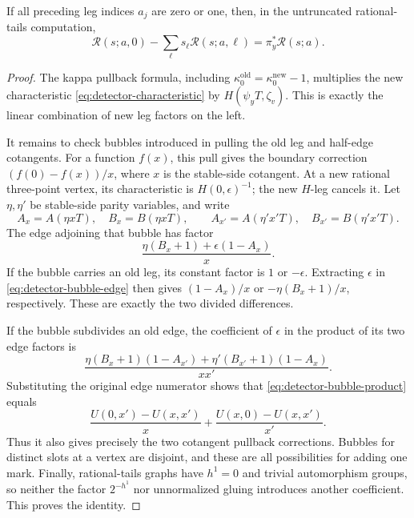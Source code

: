 \begin{lemma}
\label{lem:detector-unit}
If all preceding leg indices \(a_j\) are zero or one, then,
in the untruncated rational-tails computation,
\begin{equation}
 \mathcal R(s;a,0)
 -\sum_\ell s_\ell\mathcal R(s;a,\ell)
 =\pi_y^*\mathcal R(s;a).
 \label{eq:detector-unit}
\end{equation}
\end{lemma}

\begin{proof}
The kappa pullback formula, including
\(\kappa_0^{\mathrm{old}}=\kappa_0^{\mathrm{new}}-1\),
multiplies the new characteristic \eqref{eq:detector-characteristic} by
\(H(\psi_yT,\zeta_v)\).  This is exactly the linear
combination of new leg factors on the left.

It remains to check bubbles introduced in pulling the old
leg and half-edge cotangents.  For a function \(f(x)\), this
pull gives the boundary correction
\((f(0)-f(x))/x\), where \(x\) is the stable-side cotangent.
At a new rational three-point vertex, its characteristic is
\(H(0,\epsilon)^{-1}\); the new \(H\)-leg cancels it.
Let \(\eta,\eta'\) be stable-side parity variables, and write
\[
 A_x=A(\eta xT),\quad B_x=B(\eta xT),
 \qquad
 A_{x'}=A(\eta'x'T),\quad B_{x'}=B(\eta'x'T).
 \]
The edge adjoining that bubble has factor
\begin{equation}
 \frac{\eta(B_x+1)+\epsilon(1-A_x)}{x}.
 \label{eq:detector-bubble-edge}
\end{equation}
If the bubble carries an old leg, its constant factor is
\(1\) or \(-\epsilon\).  Extracting \(\epsilon\) in \eqref{eq:detector-bubble-edge}
then gives \((1-A_x)/x\) or
\(-\eta(B_x+1)/x\), respectively.  These are exactly the
two divided differences.

If the bubble subdivides an old edge, the coefficient of
\(\epsilon\) in the product of its two edge factors is
\begin{equation}
 \frac{\eta(B_x+1)(1-A_{x'})
       +\eta'(B_{x'}+1)(1-A_x)}{xx'}.
 \label{eq:detector-bubble-product}
\end{equation}
Substituting the original edge numerator shows that \eqref{eq:detector-bubble-product}
equals
\begin{equation}
 \frac{U(0,x')-U(x,x')}{x}
 +\frac{U(x,0)-U(x,x')}{x'}.
 \label{eq:detector-edge-difference}
\end{equation}
Thus it also gives precisely the two cotangent pullback
corrections.  Bubbles for distinct slots at a vertex are
disjoint, and these are all possibilities for adding one
mark.  Finally, rational-tails graphs have \(h^1=0\) and
trivial automorphism groups, so neither the factor
\(2^{-h^1}\) nor unnormalized gluing introduces another
coefficient.  This proves the identity.
\end{proof}

